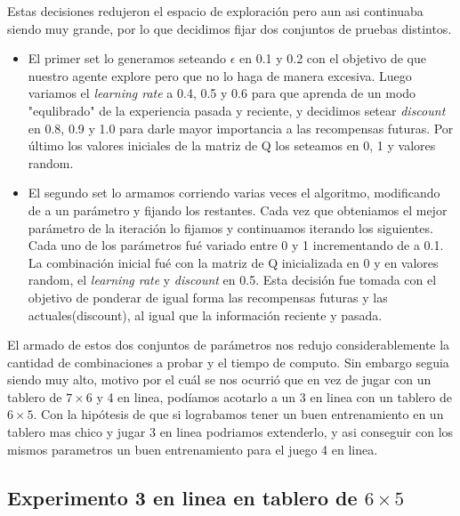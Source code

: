 Estas decisiones redujeron el espacio de exploración pero aun asi continuaba siendo muy grande, por lo que decidimos fijar dos conjuntos de pruebas distintos.

\begin{itemize}
  \item El primer set lo generamos seteando \textbf{$\epsilon$} en 0.1 y 0.2 con el objetivo de que nuestro agente explore pero que no lo haga de manera excesiva. Luego variamos el \textit{learning rate} a 0.4, 0.5 y 0.6 para que aprenda de un modo "equlibrado" de la experiencia pasada y reciente,
  y decidimos setear \textit{discount} en 0.8, 0.9 y 1.0 para darle mayor importancia a las recompensas futuras. Por último los valores iniciales de la matriz de Q los seteamos en 0, 1 y valores random.

  \item  El segundo set lo armamos corriendo varias veces el algoritmo, modificando de a un parámetro y fijando los restantes. Cada vez que obteniamos el mejor parámetro de la iteración lo fijamos y continuamos iterando los siguientes. Cada uno de los parámetros fué variado entre 0 y 1 incrementando de a 0.1.
   La combinación inicial fué con la matriz de Q inicializada en 0 y en valores random, el \textit{learning rate} y \textit{discount} en 0.5. Esta decisión fue tomada con el objetivo de ponderar de igual forma las recompensas futuras y las actuales(discount), al igual que la información reciente y pasada. \\
\end{itemize}

El armado de estos dos conjuntos de parámetros nos redujo considerablemente la cantidad de combinaciones a probar y el tiempo de computo. Sin embargo seguia siendo muy alto, motivo por el cuál se nos ocurrió que en vez de jugar con un tablero de $7\times6$ y 4 en linea, podíamos acotarlo a un 3 en linea con un tablero de $6\times5$. Con la hipótesis de que si lograbamos tener un buen entrenamiento en un tablero mas chico y jugar 3 en linea podriamos extenderlo, y asi
 conseguir con los mismos parametros un buen entrenamiento para el juego 4 en linea.



\subsection{Experimento 3 en linea en tablero de $6\times5$}

